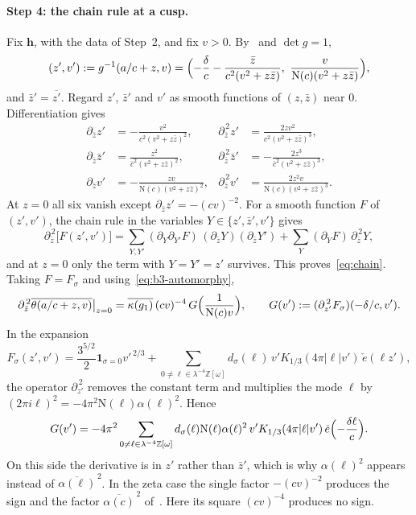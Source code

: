 \documentclass[11pt]{article}
\numberwithin{equation}{section}
\newcommand{\OO}{\mathbb Z[\omega]}
\newcommand{\N}{\mathrm N}
\newcommand{\ind}{\mathbf1}
\newcommand{\ce}{\check e}
\begin{document}
\paragraph{Step 4: the chain rule at a cusp.} Fix $\mathbf h$, with the
data of Step~2, and fix $v>0$. By~\cite[(5.1), (5.19)]{QF} and
$\det g=1$,
\begin{equation}\label{eq:d109}
 (z',v'):=g^{-1}(a/c+z,v)=\Bigl(-\frac\delta c-\frac{\bar z}
 {c^2(v^2+z\bar z)},\ \frac v{\N(c)(v^2+z\bar z)}\Bigr),
\end{equation}
and $\bar z'=\overline{z'}$. Regard $z'$, $\bar z'$ and $v'$ as smooth
functions of $(z,\bar z)$ near $0$. Differentiation gives
\begin{equation}\label{eq:d110}
\begin{aligned}
 \partial_{\bar z}z'&=-\frac{v^2}{c^2(v^2+z\bar z)^2},&
 \partial_{\bar z}^{\,2}z'&=\frac{2zv^2}{c^2(v^2+z\bar z)^3},\\
 \partial_{\bar z}\bar z'&=\frac{z^2}{\bar c^2(v^2+z\bar z)^2},&
 \partial_{\bar z}^{\,2}\bar z'&=-\frac{2z^3}{\bar c^2(v^2+z\bar z)^3},\\
 \partial_{\bar z}v'&=-\frac{zv}{\N(c)(v^2+z\bar z)^2},&
 \partial_{\bar z}^{\,2}v'&=\frac{2z^2v}{\N(c)(v^2+z\bar z)^3}.
\end{aligned}
\end{equation}
At $z=0$ all six vanish except $\partial_{\bar z}z'=-(cv)^{-2}$. For a
smooth function $F$ of $(z',v')$, the chain rule in the variables
$Y\in\{z',\bar z',v'\}$ gives
\begin{equation}\label{eq:d111}
 \partial_{\bar z}^{\,2}\bigl[F(z',v')\bigr]
 =\sum_{Y,Y'}(\partial_Y\partial_{Y'}F)\,(\partial_{\bar z}Y)
 (\partial_{\bar z}Y')+\sum_Y(\partial_YF)\,\partial_{\bar z}^{\,2}Y,
\end{equation}
and at $z=0$ only the term with $Y=Y'=z'$ survives. This
proves~\eqref{eq:chain}. Taking $F=F_\sigma$ and
using~\eqref{eq:b3-automorphy},
\begin{equation}\label{eq:b3-cusp}
 \partial_{\bar z}^{\,2}\overline{\theta(a/c+z,v)}\big|_{z=0}
 =\overline{\kappa(g_1)}\,(cv)^{-4}\,G\Bigl(\frac1{\N(c)v}\Bigr),
 \qquad G(v'):=(\partial_{z'}^{\,2}F_\sigma)(-\delta/c,v').
\end{equation}
In the expansion
\begin{equation}\label{eq:d112}
 F_\sigma(z',v')=\frac{3^{5/2}}2\ind_{\sigma=0}v'^{\,2/3}
 +\sum_{0\ne\ell\in\lambda^{-4}\OO}d_\sigma(\ell)\,v'K_{1/3}(4\pi|\ell|v')
 \,\ce(\ell z'),
\end{equation}
the operator $\partial_{z'}^{\,2}$ removes the constant term and
multiplies the mode $\ell$ by $(2\pi i\ell)^2=-4\pi^2\N(\ell)\alpha(\ell)^2$.
Hence
\begin{equation}\label{eq:b3-G}
 G(v')=-4\pi^2\sum_{0\ne\ell\in\lambda^{-4}\OO}d_\sigma(\ell)\N(\ell)
 \alpha(\ell)^2\,v'K_{1/3}(4\pi|\ell|v')\,\ce\Bigl(-\frac{\delta\ell}c\Bigr).
\end{equation}
On this side the derivative is in $z'$ rather than $\bar z'$, which is
why $\alpha(\ell)^2$ appears instead of $\overline{\alpha(\ell)}^{\,2}$. In
the zeta case the single factor $-(cv)^{-2}$ produces the sign and the
factor $\overline{\alpha(c)}^{\,2}$ of~\cite[(A.18)]{OAI1112}. Here its
square $(cv)^{-4}$ produces no sign.
\end{document}
